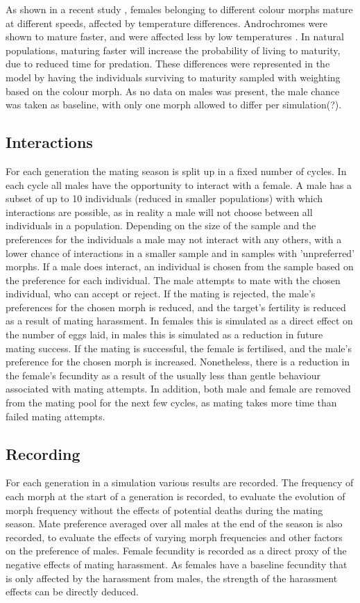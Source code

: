 \documentclass[10pt,letterpaper]{article}
\begin{document}
As shown in a recent study \cite{Svensson2019}, females belonging to different colour morphs mature at different speeds, affected by temperature differences. Androchromes were shown to mature faster, and were affected less by low temperatures \cite{Svensson2019}. In natural populations, maturing faster will increase the probability of living to maturity, due to reduced time for predation. These differences were represented in the model by having the individuals surviving to maturity sampled with weighting based on the colour morph. As no data on males was present, the male chance was taken as baseline, with only one morph allowed to differ per simulation(?).

\subsection{Interactions}
For each generation the mating season is split up in a fixed number of cycles. In each cycle all males have the opportunity to interact with a female. A male has a subset of up to 10 individuals (reduced in smaller populations) with which interactions are possible, as in reality a male will not choose between all individuals in a population. Depending on the size of the sample and the preferences for the individuals a male may not interact with any others, with a lower chance of interactions in a smaller sample and in samples with 'unpreferred' morphs. If a male does interact, an individual is chosen from the sample based on the preference for each individual. The male attempts to mate with the chosen individual, who can accept or reject. If the mating is rejected, the male's preferences for the chosen morph is reduced, and the target's fertility is reduced as a result of mating harassment. In females this is simulated as a direct effect on the number of eggs laid, in males this is simulated as a reduction in future mating success. If the mating is successful, the female is fertilised, and the male's preference for the chosen morph is increased. Nonetheless, there is a reduction in the female's fecundity as a result of the usually less than gentle behaviour associated with mating attempts. In addition, both male and female are removed from the mating pool for the next few cycles, as mating takes more time than failed mating attempts.

\subsection{Recording}
For each generation in a simulation various results are recorded. The frequency of each morph at the start of a generation is recorded, to evaluate the evolution of morph frequency without the effects of potential deaths during the mating season. Mate preference averaged over all males at the end of the season is also recorded, to evaluate the effects of varying morph frequencies and other factors on the preference of males. Female fecundity is recorded as a direct proxy of the negative effects of mating harassment. As females have a baseline fecundity that is only affected by the harassment from males, the strength of the harassment effects can be directly deduced.
\end{document}
